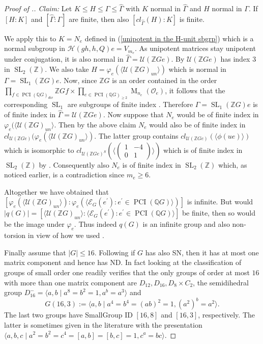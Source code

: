 \documentclass[a4paper,10pt]{amsart}
\theoremstyle{definition}
\theoremstyle{remark}
\newcommand{\SL}{\operatorname{SL}}
\newcommand{\Ma}{\operatorname{M}}
\newcommand\PCI{\operatorname{PCI}}
\newcommand{\U}{{\mathcal U}}
\newcommand\mc{\mathcal}
\newcommand\wh{\widehat}
\newcommand{\Z}{{\mathbb Z}}
\newcommand{\Q}{{\mathbb Q}}
\begin{document}
\begin{proof}[Proof of .]
{\it Claim: } Let $K \leq H \leq \Gamma \leq \wh{\Gamma}$ with $K$ normal in $\wh{\Gamma}$ and $H$ normal in $\Gamma$. 
If $[H:K]$ and $[\wh{\Gamma}: \Gamma]$ are finite, then also $[cl_{\wh{\Gamma}}(H): K]$ is finite.

We apply this to $K = N_e$ defined in (\ref{unipotent in the H-unit sbgrp}) which is a normal subgroup in $\mathcal{H}(gh,h,Q)e = V_{m_e}$. As unipotent matrices stay unipotent under conjugation, it is also normal in $\wh{\Gamma} = \U(\Z G e)$. By \cite[Proposition 8.2]{JJS} $\U(\Z G e)$ has index $3$ in $\SL_2(\Z)$.
 We also take $H = \varphi_e(\langle  \U(\Z G)_{un} \rangle)$ which is normal in $\Gamma = \SL_1(\Z G)e$. Now, since $\Z G$ is an order contained in the order $\prod_{f \in \PCI( \Q G)_{div}} \Z G f \times \prod_{e \in \PCI (\Q G)_{\geq 2}} \Ma_{n_e}(\mc{O}_e)$, it follows that the corresponding $\SL_1$ are subgroups of finite index \cite[Lemma 4.6.9 \& Proposition 5.5.1]{GRG1}. Therefore $\Gamma = \SL_1(\Z G)e$ is of finite index in $\wh{\Gamma}=\U(\Z Ge)$. Now suppose that $N_e$ would be of finite index in $\varphi_e(\langle  \U(\Z G)_{un} \rangle$. Then by the above claim $N_e$ would also be of finite index in $cl_{\U(\Z Ge)}(\varphi_e(\langle  \U(\Z G)_{un} \rangle).$ The latter group contains $cl_{\U(\Z Ge)}(\langle \phi(ue) \rangle)$ which is isomorphic to  $cl_{\U(\Z Ge)^S}\left(\langle  \begin{pmatrix}
1 & -4 \\ 0 & 1
\end{pmatrix}\rangle \right)$ which is of finite index in $\SL_2(\Z)$ by . Consequently also $N_e$ is of finite index in $\SL_2(\Z)$ which, as noticed earlier, is a contradiction since $m_e \geq 6$.

Altogether we have obtained that $[\varphi_e(\langle  \U(\Z G)_{un} \rangle) : \varphi_e(\langle \mathcal{E}_G(e^{\prime}) : e^{\prime} \in \PCI(\Q G) \rangle) ] $ is infinite. But would $|q(G)|= [\langle  \U(\Z G)_{un} \rangle : \langle \mathcal{E}_G(e^{\prime}) : e^{\prime} \in \PCI(\Q G) \rangle]$ be finite, then so would be the image under $\varphi_e$. Thus indeed $q(G)$ is an infinite group and also non-torsion in view of how we used .


Finally assume that $|G| \leq 16$. Following \cite[Remark 3.12.(ii)]{JespersSun} if $G$ has also SN, then it has at most one matrix component and hence has ND. In fact looking at the classification of groups of small order one readily verifies that the only groups of order at most $16$ with more than one matrix component are $D_{12}, D_{16}, D_8 \times C_2$, the semidihedral group $D_{16}^{-} = \langle a,b \mid a^{8} = b^2 = 1, a^b =a^3 \rangle$ and 
$$G(16,3) := \langle a,b \mid a^4 = b^4 = (ab)^2 = 1, (a^2)^b = a^2 \rangle.$$
The last two groups have SmallGroup ID $[16,8]$ and $[16,3]$, respectively. The latter is sometimes given in the literature with the presentation $\langle a,b,c \mid a^2= b^2 = c^4 = [a,b] = [b,c]= 1, c^{a}= bc\rangle.$ 


\end{proof}
\end{document}
